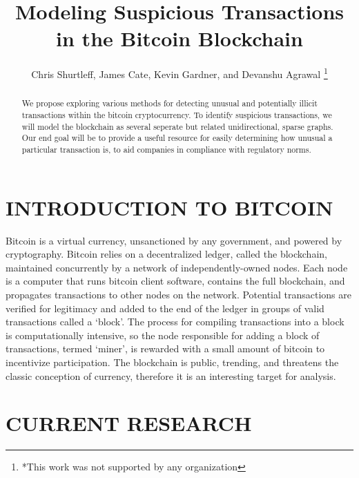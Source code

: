 \documentclass[letterpaper, 10 pt, conference]{ieeeconf}  %
\title{\LARGE \bf
Modeling Suspicious Transactions in the Bitcoin Blockchain
}
\author{Chris Shurtleff, James Cate, Kevin Gardner, and Devanshu Agrawal%
\thanks{*This work was not supported by any organization}%
}
\begin{document}
\maketitle
\thispagestyle{empty}
\pagestyle{empty}


\begin{abstract}

We propose exploring various methods for detecting unusual and potentially illicit transactions within the bitcoin cryptocurrency. To identify suspicious transactions, we will model the blockchain as several seperate but related unidirectional, sparse graphs. Our end goal will be to provide a useful resource for easily determining how unusual a particular transaction is, to aid companies in compliance with regulatory norms.

\end{abstract}


\section{INTRODUCTION TO BITCOIN}

Bitcoin is a virtual currency, unsanctioned by any government, and powered by cryptography. Bitcoin relies on a decentralized ledger, called the blockchain, maintained concurrently by a network of independently-owned nodes. Each node is a computer that runs bitcoin client software, contains the full blockchain, and propagates transactions to other nodes on the network.  Potential transactions are verified for legitimacy and added to the end of the ledger in groups of valid transactions called a ‘block’. The process for compiling transactions into a block is computationally intensive, so the node responsible for adding a block of transactions, termed ‘miner’, is rewarded with a small amount of bitcoin to incentivize participation. The blockchain is public, trending, and threatens the classic conception of currency, therefore it is an interesting target for analysis.


\section{CURRENT RESEARCH}
\end{document}
